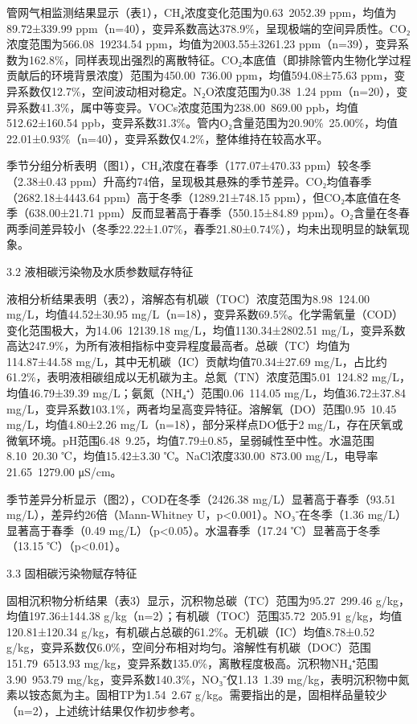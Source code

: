 \documentclass[12pt]{article}
\begin{document}
管网气相监测结果显示（表1），CH₄浓度变化范围为0.63~2052.39 ppm，均值为89.72±339.99 ppm（n=40），变异系数高达378.9\%，呈现极端的空间异质性。CO₂浓度范围为566.08~19234.54 ppm，均值为2003.55±3261.23 ppm（n=39），变异系数为162.8\%，同样表现出强烈的离散特征。CO₂本底值（即排除管内生物化学过程贡献后的环境背景浓度）范围为450.00~736.00 ppm，均值594.08±75.63 ppm，变异系数仅12.7\%，空间波动相对稳定。N₂O浓度范围为0.38~1.24 ppm（n=20），变异系数41.3\%，属中等变异。VOCs浓度范围为238.00~869.00 ppb，均值512.62±160.54 ppb，变异系数31.3\%。管内O₂含量范围为20.90\%~25.00\%，均值22.01±0.93\%（n=40），变异系数仅4.2\%，整体维持在较高水平。

季节分组分析表明（图1），CH₄浓度在春季（177.07±470.33 ppm）较冬季（2.38±0.43 ppm）升高约74倍，呈现极其悬殊的季节差异。CO₂均值春季（2682.18±4443.64 ppm）高于冬季（1289.21±748.15 ppm），但CO₂本底值在冬季（638.00±21.71 ppm）反而显著高于春季（550.15±84.89 ppm）。O₂含量在冬春两季间差异较小（冬季22.22±1.07\%，春季21.80±0.74\%），均未出现明显的缺氧现象。

3.2 液相碳污染物及水质参数赋存特征

液相分析结果表明（表2），溶解态有机碳（TOC）浓度范围为8.98~124.00 mg/L，均值44.52±30.95 mg/L（n=18），变异系数69.5\%。化学需氧量（COD）变化范围极大，为14.06~12139.18 mg/L，均值1130.34±2802.51 mg/L，变异系数高达247.9\%，为所有液相指标中变异程度最高者。总碳（TC）均值为114.87±44.58 mg/L，其中无机碳（IC）贡献均值70.34±27.69 mg/L，占比约61.2\%，表明液相碳组成以无机碳为主。总氮（TN）浓度范围5.01~124.82 mg/L，均值46.79±39.39 mg/L；氨氮（NH₄⁺）范围0.06~114.05 mg/L，均值36.72±37.84 mg/L，变异系数103.1\%，两者均呈高变异特征。溶解氧（DO）范围0.95~10.45 mg/L，均值4.80±2.26 mg/L（n=18），部分采样点DO低于2 mg/L，存在厌氧或微氧环境。pH范围6.48~9.25，均值7.79±0.85，呈弱碱性至中性。水温范围8.10~20.30 ℃，均值15.42±3.30 ℃。NaCl浓度330.00~873.00 mg/L，电导率21.65~1279.00 μS/cm。

季节差异分析显示（图2），COD在冬季（2426.38 mg/L）显著高于春季（93.51 mg/L），差异约26倍（Mann-Whitney U，p<0.001）。NO₃⁻在冬季（1.36 mg/L）显著高于春季（0.49 mg/L）（p<0.05）。水温春季（17.24 ℃）显著高于冬季（13.15 ℃）（p<0.01）。

3.3 固相碳污染物赋存特征

固相沉积物分析结果（表3）显示，沉积物总碳（TC）范围为95.27~299.46 g/kg，均值197.36±144.38 g/kg（n=2）；有机碳（TOC）范围35.72~205.91 g/kg，均值120.81±120.34 g/kg，有机碳占总碳的61.2\%。无机碳（IC）均值8.78±0.52 g/kg，变异系数仅6.0\%，空间分布相对均匀。溶解性有机碳（DOC）范围151.79~6513.93 mg/kg，变异系数135.0\%，离散程度极高。沉积物NH₄⁺范围3.90~953.79 mg/kg，变异系数140.3\%，NO₃⁻仅1.13~1.39 mg/kg，表明沉积物中氮素以铵态氮为主。固相TP为1.54~2.67 g/kg。需要指出的是，固相样品量较少（n=2），上述统计结果仅作初步参考。
\end{document}
